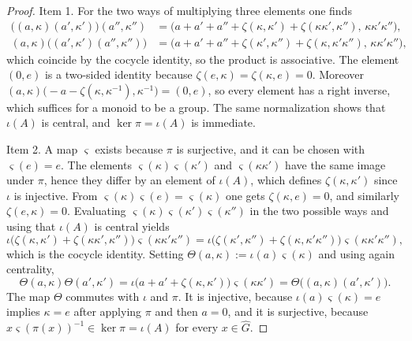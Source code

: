 \begin{proof}
	Item 1. For the two ways of multiplying three elements one finds
	\begin{align*}
		\big((a,\kappa)(a',\kappa')\big)(a'',\kappa'')&=\big(a+a'+a''+\zeta(\kappa,\kappa')+\zeta(\kappa\kappa',\kappa''),\,\kappa\kappa'\kappa''\big),\\
		(a,\kappa)\big((a',\kappa')(a'',\kappa'')\big)&=\big(a+a'+a''+\zeta(\kappa',\kappa'')+\zeta(\kappa,\kappa'\kappa''),\,\kappa\kappa'\kappa''\big),
	\end{align*}
	which coincide by the cocycle identity, so the product is associative. The element $(0,e)$ is a two-sided identity because $\zeta(e,\kappa)=\zeta(\kappa,e)=0$. Moreover $(a,\kappa)\big(-a-\zeta(\kappa,\kappa^{-1}),\kappa^{-1}\big)=(0,e)$, so every element has a right inverse, which suffices for a monoid to be a group. The same normalization shows that $\iota(A)$ is central, and $\ker\pi=\iota(A)$ is immediate.
	
	Item 2. A map $\varsigma$ exists because $\pi$ is surjective, and it can be chosen with $\varsigma(e)=e$. The elements $\varsigma(\kappa)\varsigma(\kappa')$ and $\varsigma(\kappa\kappa')$ have the same image under $\pi$, hence they differ by an element of $\iota(A)$, which defines $\zeta(\kappa,\kappa')$ since $\iota$ is injective. From $\varsigma(\kappa)\varsigma(e)=\varsigma(\kappa)$ one gets $\zeta(\kappa,e)=0$, and similarly $\zeta(e,\kappa)=0$. Evaluating $\varsigma(\kappa)\varsigma(\kappa')\varsigma(\kappa'')$ in the two possible ways and using that $\iota(A)$ is central yields
	\begin{equation*}
		\iota\big(\zeta(\kappa,\kappa')+\zeta(\kappa\kappa',\kappa'')\big)\varsigma(\kappa\kappa'\kappa'')=\iota\big(\zeta(\kappa',\kappa'')+\zeta(\kappa,\kappa'\kappa'')\big)\varsigma(\kappa\kappa'\kappa''),
	\end{equation*}
	which is the cocycle identity. Setting $\Theta(a,\kappa):=\iota(a)\varsigma(\kappa)$ and using again centrality,
	\begin{equation*}
		\Theta(a,\kappa)\Theta(a',\kappa')=\iota\big(a+a'+\zeta(\kappa,\kappa')\big)\varsigma(\kappa\kappa')=\Theta\big((a,\kappa)(a',\kappa')\big).
	\end{equation*}
	The map $\Theta$ commutes with $\iota$ and $\pi$. It is injective, because $\iota(a)\varsigma(\kappa)=e$ implies $\kappa=e$ after applying $\pi$ and then $a=0$, and it is surjective, because $x\varsigma(\pi(x))^{-1}\in\ker\pi=\iota(A)$ for every $x\in\widehat{G}$.
	

\end{proof}
